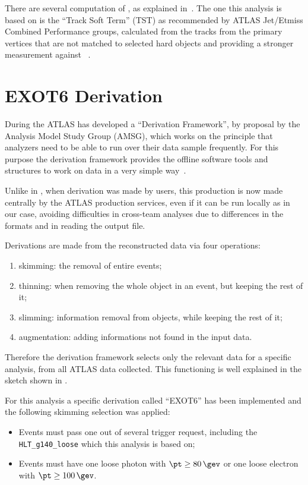 There are several computation of \met, as explained in~\cite{met}. The one this analysis is based on is the ``Track Soft Term'' (TST) as recommended by ATLAS Jet/Etmiss Combined Performance groups, calculated from the tracks from the primary vertices that are not matched to selected hard objects and providing a stronger measurement against \pileup~\cite{met}.

\section{EXOT6 Derivation}
\label{sec:derivation}
During the \RunTwo ATLAS has developed a ``Derivation Framework'', by proposal by the Analysis Model Study Group (AMSG), which works on the principle that analyzers need to be able to run over their data sample frequently. For this purpose the derivation framework provides the offline software tools and structures to work on data in a very simple way~\cite{twiki:DAOD}. 

Unlike in \RunOne, when derivation was made by users, this production is now made centrally by the ATLAS production services, even if it can be run locally as in our case, avoiding difficulties in cross-team analyses due to differences in the formats and in reading the output file.

Derivations are made from the reconstructed data via four operations:
\begin{enumerate}
\item skimming: the removal of entire events;
\item thinning: when removing the whole object in an event, but keeping the rest of it;
\item slimming: information removal from objects, while keeping the rest of it; 
\item augmentation: adding informations not found in the input data.
\end{enumerate}

Therefore the derivation framework selects only the relevant data for a specific analysis, from all ATLAS data collected. This functioning is well explained in the sketch shown in \Fig{\ref{fig:derivation}}.

For this analysis a specific derivation called ``EXOT6'' has been implemented and the following skimming selection was applied:
\begin{itemize}
\item Events must pass one out of several trigger request, including the \verb!HLT_g140_loose! which this analysis is based on;
\item Events must have one loose
photon with $\pt\ge\SI{80}{\gev}$ or one loose electron with \mbox{$\pt\ge\SI{100}{\gev}$}.
\end{itemize}

